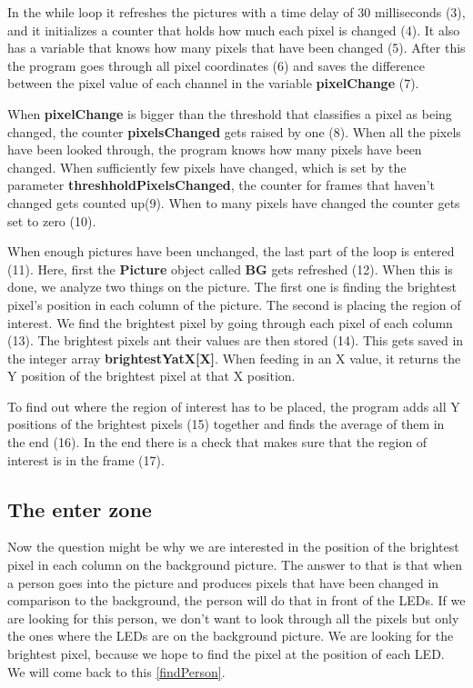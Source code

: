In the while loop it refreshes the pictures with a time delay of 30 milliseconds (3), and it initializes a counter that holds how much each pixel is changed (4). It also has a variable that knows how many pixels that have been changed (5). After this the program goes through all pixel coordinates (6) and saves the difference between the pixel value of each channel in the variable \textbf{pixelChange} (7).

When \textbf{pixelChange} is bigger than the threshold that classifies a pixel as being changed, the counter \textbf{pixelsChanged} gets raised by one (8). When all the pixels have been looked through, the program knows how many pixels have been changed. When sufficiently few pixels have changed, which is set by the parameter \textbf{threshholdPixelsChanged}, the counter for frames that haven't changed gets counted up(9). When to many pixels have changed the counter gets set to zero (10).
 
When enough pictures have been unchanged, the last part of the loop is entered (11). Here, first the  \textbf{Picture} object called \textbf{BG} gets refreshed (12). When this is done, we analyze two things on the picture. The first one is finding the brightest pixel's position in each column of the picture. The second is placing the region of interest. We find the brightest pixel by going through each pixel of each column (13). The brightest pixels ant their values are then stored (14). This gets saved in the integer array \textbf{brightestYatX[X]}. When feeding in an X value, it returns the Y position of the brightest pixel at that X position.

To find out where the region of interest has to be placed, the program adds all Y positions of the brightest pixels (15) together and finds the average of them in the end (16). In the end there is a check that makes sure that the region of interest is in the frame (17).

\subsection{The enter zone}
Now the question might be why we are interested in the position of the brightest pixel in each column on the background picture. The answer to that is that when a person goes into the picture and produces pixels that have been changed in comparison to the background, the person will do that in front of the LEDs. If we are looking for this person, we don't want to look through all the pixels but only the ones where the LEDs are on the background picture. We are looking for the brightest pixel, because we hope to find the pixel at the position of each LED. We will come back to this \ref{findPerson}.

